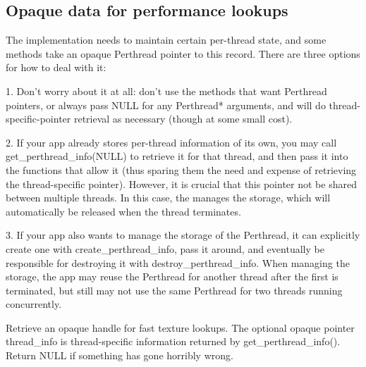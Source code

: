 \subsection{Opaque data for performance lookups}
\label{sec:texturesys:api:opaque}

 

The \TextureSystem implementation needs to maintain certain per-thread
state, and some \TextureSystem methods take an opaque {\cf Perthread} pointer
to this record. There are three options for how to deal with it:

1. Don't worry about it at all: don't use the methods that want {\cf
Perthread} pointers, or always pass {\cf NULL} for any {\cf Perthread*}
arguments, and \TextureSystem will do thread-specific-pointer retrieval as
necessary (though at some small cost).

2. If your app already stores per-thread information of its own, you may
call {\cf get_perthread_info(NULL)} to retrieve it for that thread, and then
pass it into the functions that allow it (thus sparing them the need and
expense of retrieving the thread-specific pointer). However, it is crucial
that this pointer not be shared between multiple threads. In this case,
the \TextureSystem manages the storage, which will automatically be released
when the thread terminates.

3. If your app also wants to manage the storage of the {\cf Perthread},
it can explicitly create one with {\cf create_perthread_info}, pass it around,
and eventually be responsible for destroying it with {\cf destroy_perthread_info}.
When managing the storage, the app may reuse the {\cf Perthread} for another
thread after the first is terminated, but still may not use the same
{\cf Perthread} for two threads running concurrently.
\apiend


Retrieve an opaque handle for fast texture lookups.  The optional opaque
pointer {\cf thread_info} is thread-specific information returned by
{\cf get_perthread_info()}.  Return {\cf NULL} if something has gone
horribly wrong.
\apiend

